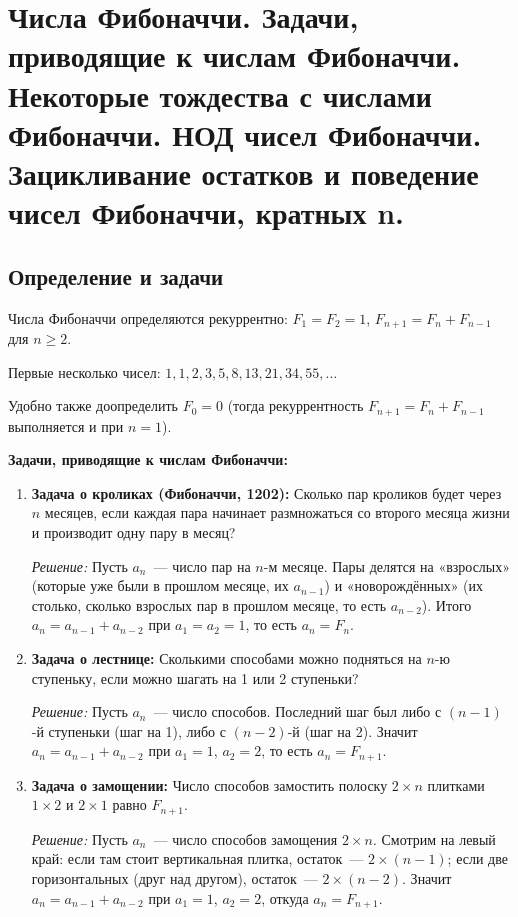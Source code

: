 \documentclass[12pt]{article}
\begin{document}
	\tableofcontents
	\setcounter{tocdepth}{3}
	\newpage
	
	\section{Числа Фибоначчи. Задачи, приводящие к числам Фибоначчи. Некоторые тождества с числами Фибоначчи. НОД чисел Фибоначчи. Зацикливание остатков и поведение чисел Фибоначчи, кратных n.}
	
	\subsection{Определение и задачи}
	
	\begin{definition}
		Числа Фибоначчи определяются рекуррентно: $F_1 = F_2 = 1$, $F_{n+1} = F_n + F_{n-1}$ для $n \geqslant 2$.
	\end{definition}
	
	Первые несколько чисел: $1, 1, 2, 3, 5, 8, 13, 21, 34, 55, \dots$
	
	Удобно также доопределить $F_0 = 0$ (тогда рекуррентность $F_{n+1} = F_n + F_{n-1}$ выполняется и при $n = 1$).
	
	\textbf{Задачи, приводящие к числам Фибоначчи:}
	\begin{enumerate}
		\item \textbf{Задача о кроликах (Фибоначчи, 1202):} Сколько пар кроликов будет через $n$ месяцев, если каждая пара начинает размножаться со второго месяца жизни и производит одну пару в месяц?
		
		\textit{Решение:} Пусть $a_n$~--- число пар на $n$-м месяце. Пары делятся на «взрослых» (которые уже были в прошлом месяце, их $a_{n-1}$) и «новорождённых» (их столько, сколько взрослых пар в прошлом месяце, то есть $a_{n-2}$). Итого $a_n = a_{n-1} + a_{n-2}$ при $a_1 = a_2 = 1$, то есть $a_n = F_n$.
		
		\item \textbf{Задача о лестнице:} Сколькими способами можно подняться на $n$-ю ступеньку, если можно шагать на 1 или 2 ступеньки?
		
		\textit{Решение:} Пусть $a_n$~--- число способов. Последний шаг был либо с $(n-1)$-й ступеньки (шаг на 1), либо с $(n-2)$-й (шаг на 2). Значит $a_n = a_{n-1} + a_{n-2}$ при $a_1 = 1$, $a_2 = 2$, то есть $a_n = F_{n+1}$.
		
		\item \textbf{Задача о замощении:} Число способов замостить полоску $2 \times n$ плитками $1 \times 2$ и $2 \times 1$ равно $F_{n+1}$.
		
		\textit{Решение:} Пусть $a_n$~--- число способов замощения $2 \times n$. Смотрим на левый край: если там стоит вертикальная плитка, остаток~--- $2 \times (n-1)$; если две горизонтальных (друг над другом), остаток~--- $2 \times (n-2)$. Значит $a_n = a_{n-1} + a_{n-2}$ при $a_1 = 1$, $a_2 = 2$, откуда $a_n = F_{n+1}$.
	\end{enumerate}
	
\end{document}
